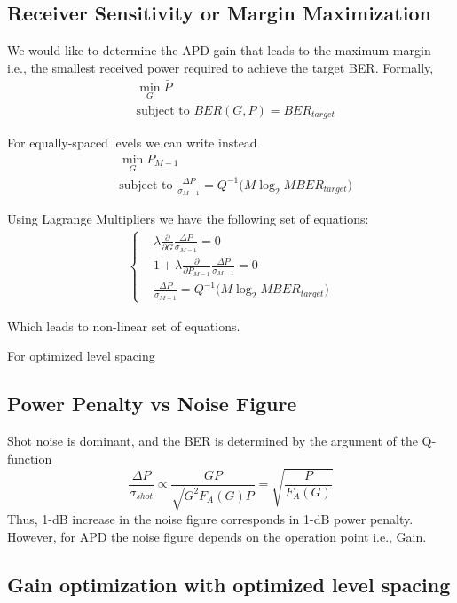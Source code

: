 \documentclass[a4paper]{article}
\begin{document}
\subsection{Receiver Sensitivity or Margin Maximization}

We would like to determine the APD gain that leads to the maximum margin i.e., the smallest received power required to achieve the target BER. Formally,
\begin{align}
&\min_G \bar{P} \\
&\text{subject to } BER(G, P) = BER_{target}
\end{align}

For equally-spaced levels we can write instead
\begin{align}
&\min_G P_{M-1} \\
&\text{subject to } \frac{\Delta P}{\sigma_{M-1}} = Q^{-1}\Big(M\log_2 MBER_{target}\Big)
\end{align}

Using Lagrange Multipliers we have the following set of equations:
\begin{align}
\begin{cases}
& \lambda \frac{\partial}{\partial G} \frac{\Delta P}{\sigma_{M-1}} = 0 \\
& 1 + \lambda \frac{\partial}{\partial P_{M-1}} \frac{\Delta P}{\sigma_{M-1}} = 0 \\
& \frac{\Delta P}{\sigma_{M-1}} = Q^{-1}\Big(M\log_2 MBER_{target}\Big)
\end{cases}
\end{align}

Which leads to non-linear set of equations.

For optimized level spacing

\subsection{Power Penalty vs Noise Figure}

Shot noise is dominant, and the BER is determined by the argument of the Q-function
\begin{equation}
\frac{\Delta P}{\sigma_{shot}} \propto \frac{GP}{\sqrt{G^2F_A(G)P}} = \sqrt{\frac{P}{F_A(G)}}
\end{equation}
Thus, 1-dB increase in the noise figure corresponds in 1-dB power penalty. However, for APD the noise figure depends on the operation point i.e., Gain.

\subsection{Gain optimization with optimized level spacing}
\end{document}
